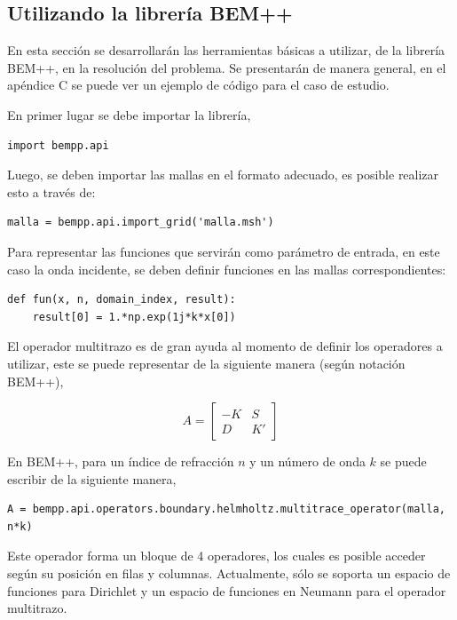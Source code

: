 \documentclass[12pt,letterpaper]{article}
\numberwithin{equation}{section}
\begin{document}
\subsection{Utilizando la librería BEM++}
En esta sección se desarrollarán las herramientas básicas a utilizar, de la librería BEM++, en la resolución del problema. Se presentarán de manera general, en el apéndice C se puede ver un ejemplo de código para el caso de estudio.

En primer lugar se debe importar la librería,

\begin{lstlisting}
import bempp.api
\end{lstlisting}

Luego, se deben importar las mallas en el formato adecuado, es posible realizar esto a través de:

\begin{lstlisting}
malla = bempp.api.import_grid('malla.msh')
\end{lstlisting}

Para representar las funciones que servirán como parámetro de entrada, en este caso la onda incidente, se deben definir funciones en las mallas correspondientes:

\begin{lstlisting}
def fun(x, n, domain_index, result):
	result[0] = 1.*np.exp(1j*k*x[0])
\end{lstlisting}

El operador multitrazo es de gran ayuda al momento de definir los operadores a utilizar, este se puede representar de la siguiente manera (según notación BEM++),

$$
A =
	\begin{bmatrix}
		-K & S\\
		D & K'
	\end{bmatrix}
$$

\pagebreak
En BEM++, para un índice de refracción $n$ y un número de onda $k$ se puede escribir de la siguiente manera,

\begin{lstlisting}
A = bempp.api.operators.boundary.helmholtz.multitrace_operator(malla, n*k)
\end{lstlisting}

Este operador forma un bloque de 4 operadores, los cuales es posible acceder según su posición en filas y columnas. Actualmente, sólo se soporta un espacio de funciones para Dirichlet y un espacio de funciones en Neumann para el operador multitrazo. 
\end{document}
